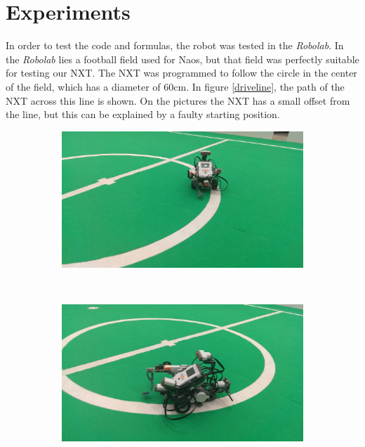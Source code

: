 \documentclass[12pt]{article}
\begin{document}
\section{Experiments}
In order to test the code and formulas, the robot was tested in the \textit{Robolab}. In the \textit{Robolab} lies a football field used for Naos, but that field was perfectly suitable for testing our NXT. The NXT was programmed to follow the circle in the center of the field, which has a diameter of 60cm. In figure \ref{driveline}, the path of the NXT across this line is shown. On the pictures the NXT has a small offset from the line, but this can be explained by a faulty starting position. \\
\begin{figure}[h!]
    \centering
    \begin{subfigure}[b]{0.3\textwidth}
            \includegraphics[width=\textwidth]{lijn1.jpg}
    \end{subfigure}%
    ~ 
    \begin{subfigure}[b]{0.3\textwidth}
            \includegraphics[width=\textwidth]{lijn2.jpg}
    \end{subfigure}

\end{figure}
\end{document}
